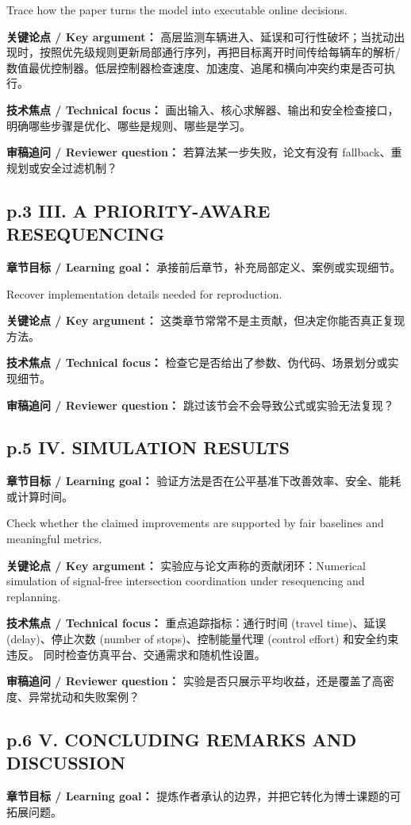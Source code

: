 \documentclass[UTF8,a4paper,11pt,fontset=fandol]{ctexart}
\begin{document}
Trace how the paper turns the model into executable online decisions.

\textbf{关键论点 / Key argument：} 高层监测车辆进入、延误和可行性破坏；当扰动出现时，按照优先级规则更新局部通行序列，再把目标离开时间传给每辆车的解析/数值最优控制器。低层控制器检查速度、加速度、追尾和横向冲突约束是否可执行。

\textbf{技术焦点 / Technical focus：} 画出输入、核心求解器、输出和安全检查接口，明确哪些步骤是优化、哪些是规则、哪些是学习。

\textbf{审稿追问 / Reviewer question：} 若算法某一步失败，论文有没有 fallback、重规划或安全过滤机制？

\subsection*{p.3 III. A PRIORITY-AWARE RESEQUENCING}
\textbf{章节目标 / Learning goal：} 承接前后章节，补充局部定义、案例或实现细节。

Recover implementation details needed for reproduction.

\textbf{关键论点 / Key argument：} 这类章节常常不是主贡献，但决定你能否真正复现方法。

\textbf{技术焦点 / Technical focus：} 检查它是否给出了参数、伪代码、场景划分或实现细节。

\textbf{审稿追问 / Reviewer question：} 跳过该节会不会导致公式或实验无法复现？

\subsection*{p.5 IV. SIMULATION RESULTS}
\textbf{章节目标 / Learning goal：} 验证方法是否在公平基准下改善效率、安全、能耗或计算时间。

Check whether the claimed improvements are supported by fair baselines and meaningful metrics.

\textbf{关键论点 / Key argument：} 实验应与论文声称的贡献闭环：Numerical simulation of signal-free intersection coordination under resequencing and replanning.

\textbf{技术焦点 / Technical focus：} 重点追踪指标：通行时间 (travel time)、延误 (delay)、停止次数 (number of stops)、控制能量代理 (control effort) 和安全约束违反。 同时检查仿真平台、交通需求和随机性设置。

\textbf{审稿追问 / Reviewer question：} 实验是否只展示平均收益，还是覆盖了高密度、异常扰动和失败案例？

\subsection*{p.6 V. CONCLUDING REMARKS AND DISCUSSION}
\textbf{章节目标 / Learning goal：} 提炼作者承认的边界，并把它转化为博士课题的可拓展问题。
\end{document}
